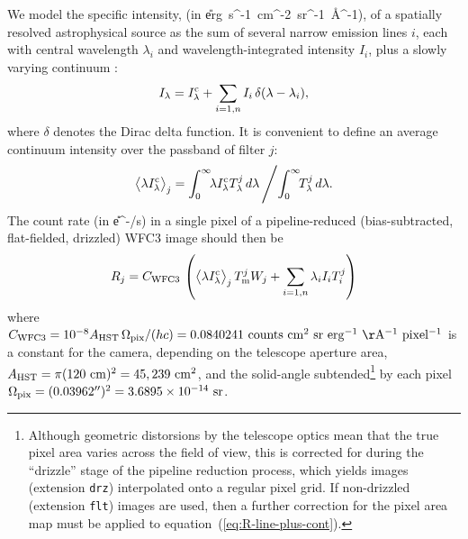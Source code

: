\documentclass[preprint]{aastex}
\begin{document}
We model the specific intensity, \Ilam (in \U{erg\ s^{-1}\ cm^{-2}\
  sr^{-1}\ \AA^{-1}}), of a spatially resolved astrophysical source as
the sum of several narrow emission lines \(i\), each with central
wavelength \(\lambda_i\) and wavelength-integrated intensity \(I_i\),
plus a slowly varying continuum \Icont:
\begin{equation}
  \label{eq:line-plus-cont}
  I_\lambda = I_\lambda^{\mathrm{c}} + \sum_{i=1, n} I_i\, \delta(\lambda - \lambda_i)  ,
\end{equation}
where \(\delta\) denotes the Dirac delta function.   It is convenient
to define an average continuum intensity over the passband of filter \(j\): 
\begin{equation}
  \label{eq:average}
  \bigl\langle \lambda I_\lambda^{\mathrm{c}} \bigr\rangle_{j} = \int_0^\infty \!\!\lambda I_\lambda^{\mathrm{c}}  T_{\lambda}^{j} \, d\lambda \,
  \Bigg/\! \int_0^\infty \!\!T_{\lambda}^{j} \, d\lambda .
\end{equation}
The count rate (in \U{e^-/s}) in a single pixel of a pipeline-reduced
(bias-subtracted, flat-fielded, drizzled) WFC3 image should then be
\begin{equation}
  \label{eq:R-line-plus-cont}
  R_j 
  = C_{\mathrm{WFC3}}\,
  \left(
    \bigl\langle \lambda I_\lambda^{\mathrm{c}} \bigr\rangle_{j} \, T_{\mathrm{m}}^{j} W_j 
    + \sum_{i=1,n} \lambda_i I_i T_{i}^{j}
  \right)
\end{equation}
where \(\Constant = 10^{-8} \Area\, \Pixel / (h c) = 0.0840241\
\U{counts\ cm^2\ sr\ erg^{-1}\ \AA^{-1}\ pixel^{-1}}\) is a constant
for the camera, depending on the telescope aperture area, \(A_{\mathrm{HST}} =
\pi (120\ \mathrm{cm})^2 = 45,239\ \mathrm{cm^2}\), and the solid-angle
subtended\footnote{Although geometric distorsions by the telescope
  optics mean that the true pixel area varies across the field of
  view, this is corrected for during the ``drizzle'' stage of the
  pipeline reduction process, which yields images (extension
  \texttt{drz}) interpolated onto a regular pixel grid.  If
  non-drizzled (extension \texttt{flt}) images are used, then a
  further correction for the pixel area map must be applied to
  equation~(\ref{eq:R-line-plus-cont}).} by each pixel \(\Omega_{\mathrm{pix}} =
(0.03962'')^2 = 3.6895\times 10^{-14}\ \mathrm{sr}\).

\newcommand\F[1]{%
  \ifmmode\scriptscriptstyle\mathrm{#1}\else #1\fi
}
\newcommand\Falpha[1]{\ensuremath{\alpha_{\F{#1}}}}
\newcommand\Fbeta[1]{\ensuremath{\beta_{\F{#1}}}}
\end{document}
